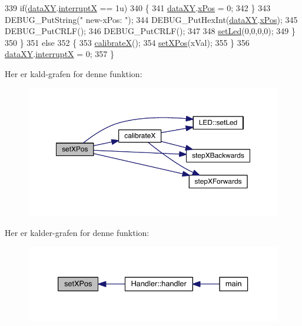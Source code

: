 \begin{DoxyCode}
339       \textcolor{keywordflow}{if}(\hyperlink{data_8h_a89d7998a721b3f36f9f4131e7a5e42d2}{dataXY}.\hyperlink{data_8h_a4cacb2964bb4b589bf79aa64a398725b}{interruptX} == 1u)
340       \{
341         \hyperlink{data_8h_a89d7998a721b3f36f9f4131e7a5e42d2}{dataXY}.\hyperlink{data_8h_a5262e09f478a571552e65be75c506bdb}{xPos} = 0;
342       \}
343       DEBUG\_PutString(\textcolor{stringliteral}{" new-xPos: "});
344       DEBUG\_PutHexInt(\hyperlink{data_8h_a89d7998a721b3f36f9f4131e7a5e42d2}{dataXY}.\hyperlink{data_8h_a5262e09f478a571552e65be75c506bdb}{xPos});
345       DEBUG\_PutCRLF();
346       DEBUG\_PutCRLF();
347       
348       \hyperlink{led_8h_a1d8e725e3829da99c1d027ba0a2ce57a}{setLed}(0,0,0,0);
349     \}
350   \}
351   \textcolor{keywordflow}{else}
352   \{
353     \hyperlink{class_x_y_a852d7d757cec8e85e0b436969d0ce237}{calibrateX}();
354     \hyperlink{class_x_y_ac4bc2d178bbf432fc918391abd379af6}{setXPos}(xVal);
355   \}
356   \hyperlink{data_8h_a89d7998a721b3f36f9f4131e7a5e42d2}{dataXY}.\hyperlink{data_8h_a4cacb2964bb4b589bf79aa64a398725b}{interruptX} = 0;
357 \}
\end{DoxyCode}


Her er kald-\/grafen for denne funktion\+:
\nopagebreak
\begin{figure}[H]
\begin{center}
\leavevmode
\includegraphics[width=350pt]{db/d87/class_x_y_ac4bc2d178bbf432fc918391abd379af6_cgraph}
\end{center}
\end{figure}




Her er kalder-\/grafen for denne funktion\+:
\nopagebreak
\begin{figure}[H]
\begin{center}
\leavevmode
\includegraphics[width=333pt]{db/d87/class_x_y_ac4bc2d178bbf432fc918391abd379af6_icgraph}
\end{center}
\end{figure}


